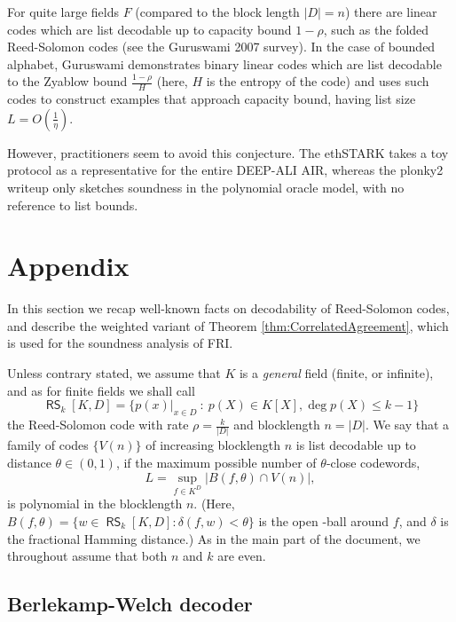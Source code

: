 \documentclass[11pt,article,oneside]{memoir}
\theoremstyle{definition}
\theoremstyle{remark}
\DeclareMathOperator{\RS}{\mathsf{RS}}
\begin{document}
For quite large fields $F$ (compared to the block length $|D|=n$) there are linear codes which are list decodable up to capacity bound $1-\rho$, such as the folded Reed-Solomon codes (see the Guruswami 2007 survey). 
In the case of bounded alphabet, Guruswami \cite{ListDecodingBook} demonstrates binary linear codes which are list decodable to the Zyablow bound $\frac{1-\rho}{H}$ (here, $H$ is the entropy of the code) and uses such codes to construct examples that approach capacity bound, having list size $L=O\left(\frac{1}{\eta}\right)$. 

However, practitioners seem to avoid this conjecture. 
The ethSTARK \cite{ethSTARK} takes a toy protocol as a representative for the entire DEEP-ALI AIR, whereas the plonky2 writeup \cite{PolygonZero} only sketches soundness in the polynomial oracle model, with no reference to list bounds.






\appendix
\newpage
\chapter{Appendix}
\label{s:Appendix}

In this section we recap well-known facts on decodability of Reed-Solomon codes\footnotemark, and describe the weighted variant of Theorem \ref{thm:CorrelatedAgreement}, which is used for the soundness analysis of FRI.

Unless contrary stated, we assume that $K$ is a \textit{general} field (finite, or infinite), and as for finite fields we shall call
\[ 
\RS_k[K,D]=\big\{p(x)|_{x\in D} \: :\: p(X)\in K[X], \deg p(X)\leq k-1 \big\}
\]
the Reed-Solomon code with rate $\rho=\frac{k}{|D|}$ and blocklength $n=|D|$. 
We say that a family of codes $\{V(n)\}$ of increasing blocklength $n$ is list decodable up to distance $\theta\in (0,1)$, if the maximum possible number of $\theta$-close codewords,
\[
L = \sup_{f\in K^D} \big| B(f,\theta)\cap V(n) \big|,
\]
is polynomial in the blocklength $n$. 
(Here,  $B(f,\theta)= \{w\in \RS_k[K,D] : \delta(f,w)< \theta\}$
 is the open -ball around $f$, and $\delta$ is the fractional Hamming distance.)   
As in the main part of the document, we throughout assume that both $n$ and $k$ are even.

\section{Berlekamp-Welch decoder}
\end{document}
